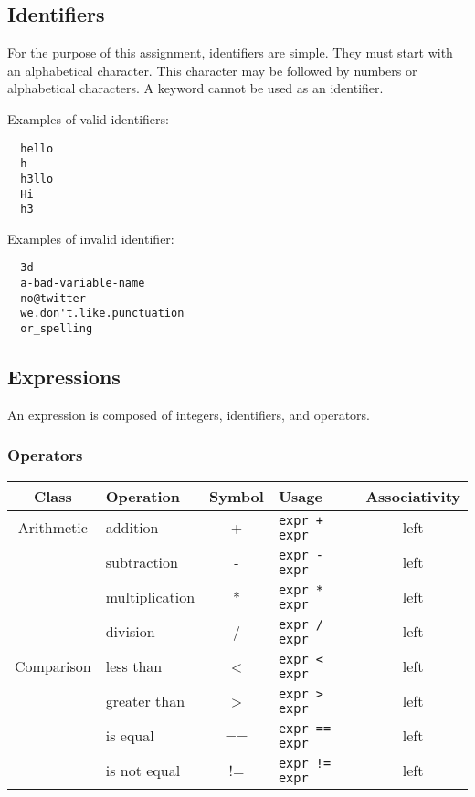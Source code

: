 \documentclass{article}
\begin{document}
\subsection{Identifiers}
For the purpose of this assignment, identifiers are simple. They must start with an alphabetical
character. This character may be followed by numbers or alphabetical characters. A keyword cannot
be used as an identifier.

Examples of valid identifiers:
\begin{lstlisting}
  hello
  h
  h3llo
  Hi
  h3
\end{lstlisting}

Examples of invalid identifier:
\begin{lstlisting}
  3d
  a-bad-variable-name
  no@twitter
  we.don't.like.punctuation
  or_spelling
\end{lstlisting}

\subsection{Expressions}
An expression is composed of integers, identifiers, and operators.

\subsubsection{Operators}

\begin{center}
  \begin{tabular}{|c|l|c|l|c|}
    \hline
    \textbf{Class} & \textbf{Operation} & \textbf{Symbol} & \textbf{Usage} &
    \textbf{Associativity} \\
    \hline
    Arithmetic
    &addition      & + & \texttt{expr + expr} & left \\
    &subtraction    & - & \texttt{expr - expr} & left \\
    &multiplication & * & \texttt{expr * expr} & left \\
    &division       & / & \texttt{expr / expr} & left \\
    \hline
    Comparison
    &less than      & <  & \texttt{expr < expr}  & left \\
    &greater than   & >  & \texttt{expr > expr}  & left \\
    &is equal       & == & \texttt{expr == expr} & left \\
    &is not equal   & != & \texttt{expr != expr} & left \\
    \hline
  \end{tabular}
\end{center}
\end{document}
